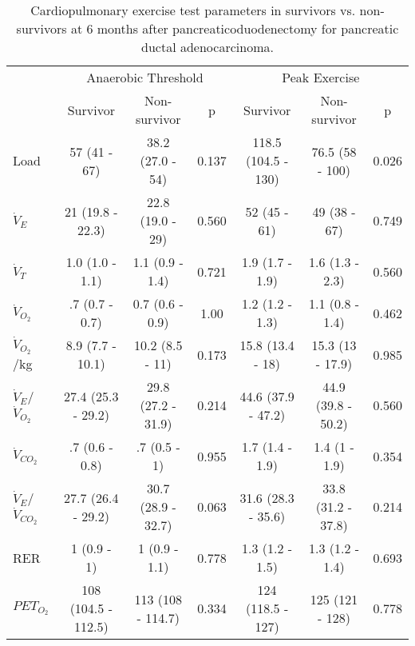 \begin{sidewaystable}[hp]
	\centering
	\caption{Cardiopulmonary exercise test parameters in survivors vs. non-survivors at 6 months after pancreaticoduodenectomy for pancreatic ductal adenocarcinoma. }
	\label{table:cpet_survival_6months}
	\renewcommand{\arraystretch}{1.2} %
	\begin{tabular}{l | c c c | c c c}
		                             &     \multicolumn{3}{c}{Anaerobic Threshold}      &        \multicolumn{3}{c}{Peak Exercise}         \\
		                             & Survivor            & Non-survivor       & p     & Survivor            & Non-survivor       & p     \\ \hline
		Load                         & 57 (41 - 67)        & 38.2 (27.0 - 54)   & 0.137 & 118.5 (104.5 - 130) & 76.5 (58 - 100)    & 0.026 \\
		$\dot{V}_E$                  & 21 (19.8 - 22.3)    & 22.8 (19.0 - 29)   & 0.560 & 52 (45 - 61)        & 49 (38 - 67)       & 0.749 \\
		$\dot{V}_T$                  & 1.0 (1.0 - 1.1)     & 1.1 (0.9 - 1.4)    & 0.721 & 1.9 (1.7 - 1.9)     & 1.6 (1.3 - 2.3)    & 0.560 \\
		$\dot{V}_{O_2}$              & .7 (0.7 - 0.7)      & 0.7 (0.6 - 0.9)    & 1.00  & 1.2 (1.2 - 1.3)     & 1.1 (0.8 - 1.4)    & 0.462 \\
		$\dot{V}_{O_2}$/kg           & 8.9 (7.7 - 10.1)    & 10.2 (8.5 - 11)    & 0.173 & 15.8 (13.4 - 18)    & 15.3 (13 - 17.9)   & 0.985 \\
		$\dot{V}_E$/$\dot{V}_{O_2}$  & 27.4 (25.3 - 29.2)  & 29.8 (27.2 - 31.9) & 0.214 & 44.6 (37.9 - 47.2)  & 44.9 (39.8 - 50.2) & 0.560 \\
		$\dot{V}_{CO_2}$             & .7 (0.6 - 0.8)      & .7 (0.5 - 1)       & 0.955 & 1.7 (1.4 - 1.9)     & 1.4 (1 - 1.9)      & 0.354 \\
		$\dot{V}_E$/$\dot{V}_{CO_2}$ & 27.7 (26.4 - 29.2)  & 30.7 (28.9 - 32.7) & 0.063 & 31.6 (28.3 - 35.6)  & 33.8 (31.2 - 37.8) & 0.214 \\
		RER                          & 1 (0.9 - 1)         & 1  (0.9 - 1.1)     & 0.778 & 1.3 (1.2 - 1.5)     & 1.3 (1.2 - 1.4)    & 0.693 \\
		$PET_{O_2}$                     & 108 (104.5 - 112.5) & 113 (108 - 114.7)  & 0.334 & 124 (118.5 - 127)   & 125 (121 - 128)    & 0.778 \\

\end{tabular}
\end{sidewaystable}
